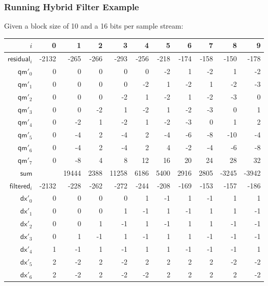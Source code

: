 \subsubsection{Running Hybrid Filter Example}
Given a \textsf{block size} of 10 and a 16 bits per sample stream:
\begin{table}[h]
  {
    \begin{tabular}{r|rrrrrrrrrr}
      $i$ & 0 & 1 & 2 & 3 & 4 & 5 & 6 & 7 & 8 & 9 \\
      \hline
      $\textsf{residual}_i$ & -2132 & -265 & -266 & -293 & -256 & -218 & -174 & -158 & -150 & -178 \\
      \hline
      $\textsf{qm}'_{0}$ & 0 & 0 & 0 & 0 & 0 & -2 & 1 & -2 & 1 & -2 \\
      $\textsf{qm}'_{1}$ & 0 & 0 & 0 & 0 & -2 & 1 & -2 & 1 & -2 & -3 \\
      $\textsf{qm}'_{2}$ & 0 & 0 & 0 & -2 & 1 & -2 & 1 & -2 & -3 & 0 \\
      $\textsf{qm}'_{3}$ & 0 & 0 & -2 & 1 & -2 & 1 & -2 & -3 & 0 & 1 \\
      $\textsf{qm}'_{4}$ & 0 & -2 & 1 & -2 & 1 & -2 & -3 & 0 & 1 & 2 \\
      $\textsf{qm}'_{5}$ & 0 & -4 & 2 & -4 & 2 & -4 & -6 & -8 & -10 & -4 \\
      $\textsf{qm}'_{6}$ & 0 & -4 & 2 & -4 & 2 & 4 & -2 & -4 & -6 & -8 \\
      $\textsf{qm}'_{7}$ & 0 & -8 & 4 & 8 & 12 & 16 & 20 & 24 & 28 & 32 \\
      \hline
      $\textsf{sum}$ &  & 19444 & 2388 & 11258 & 6186 & 5400 & 2916 & 2805 & -3245 & -3942 \\
      \hline
      $\textsf{filtered}_i$ & -2132 & -228 & -262 & -272 & -244 & -208 & -169 & -153 & -157 & -186 \\
      \hline
      $\textsf{dx}'_{0}$ & 0 & 0 & 0 & 0 & 1 & -1 & 1 & -1 & 1 & 1 \\
      $\textsf{dx}'_{1}$ & 0 & 0 & 0 & 1 & -1 & 1 & -1 & 1 & 1 & -1 \\
      $\textsf{dx}'_{2}$ & 0 & 0 & 1 & -1 & 1 & -1 & 1 & 1 & -1 & -1 \\
      $\textsf{dx}'_{3}$ & 0 & 1 & -1 & 1 & -1 & 1 & 1 & -1 & -1 & -1 \\
      $\textsf{dx}'_{4}$ & 1 & -1 & 1 & -1 & 1 & 1 & -1 & -1 & -1 & 1 \\
      $\textsf{dx}'_{5}$ & 2 & -2 & 2 & -2 & 2 & 2 & 2 & 2 & -2 & -2 \\
      $\textsf{dx}'_{6}$ & 2 & -2 & 2 & -2 & -2 & 2 & 2 & 2 & 2 & -2 \\

\end{tabular}}
\end{table}
